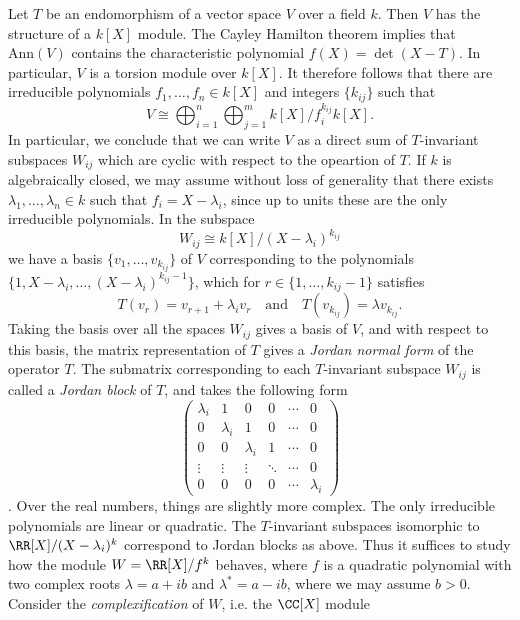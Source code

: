 \begin{example}
    Let $T$ be an endomorphism of a vector space $V$ over a field $k$. Then $V$ has the structure of a $k[X]$ module. The Cayley Hamilton theorem implies that $\text{Ann}(V)$ contains the characteristic polynomial $f(X) = \det(X - T)$. In particular, $V$ is a torsion module over $k[X]$. It therefore follows that there are irreducible polynomials $f_1, \dots, f_n \in k[X]$ and integers $\{ k_{ij} \}$ such that
    \[ V \cong \bigoplus_{i=1}^n \bigoplus_{j = 1}^m k[X]/f_i^{k_{ij}} k[X]. \]
    In particular, we conclude that we can write $V$ as a direct sum of $T$-invariant subspaces $W_{ij}$ which are cyclic with respect to the opeartion of $T$. If $k$ is algebraically closed, we may assume without loss of generality that there exists $\lambda_1, \dots, \lambda_n \in k$ such that $f_i = X - \lambda_i$, since up to units these are the only irreducible polynomials. In the subspace
    \[ W_{ij} \cong k[X] / (X - \lambda_i)^{k_{ij}} \]
    we have a basis $\{ v_1, \dots, v_{k_{ij}} \}$ of $V$ corresponding to the polynomials $\{ 1, X - \lambda_i, \dots, (X - \lambda_i)^{k_{ij}-1} \}$, which for $r \in \{ 1, \dots, k_{ij} - 1 \}$ satisfies
    \[ T(v_r) = v_{r+1} + \lambda_i v_r \quad\text{and}\quad T(v_{k_{ij}}) = \lambda v_{k_{ij}}. \]
    Taking the basis over all the spaces $W_{ij}$ gives a basis of $V$, and with respect to this basis, the matrix representation of $T$ gives a \emph{Jordan normal form} of the operator $T$. The submatrix corresponding to each $T$-invariant subspace $W_{ij}$ is called a \emph{Jordan block} of $T$, and takes the following form
    \[ \begin{pmatrix} \lambda_i & 1 & 0 & 0 & \cdots & 0 \\ 0 & \lambda_i & 1 & 0 & \cdots & 0 \\ 0 & 0 & \lambda_i & 1 & \cdots & 0 \\ \vdots & \vdots & \vdots & \ddots & \cdots & 0 \\ 0 & 0 & 0 & 0 & \cdots & \lambda_i \end{pmatrix} \].
    Over the real numbers, things are slightly more complex. The only irreducible polynomials are linear or quadratic. The $T$-invariant subspaces isomorphic to $\RR[X]/(X - \lambda_i)^k$ correspond to Jordan blocks as above. Thus it suffices to study how the module $W = \RR[X]/f^k$ behaves, where $f$ is a quadratic polynomial with two complex roots $\lambda = a + ib$ and $\lambda^* = a - ib$, where we may assume $b > 0$. Consider the \emph{complexification} of $W$, i.e. the $\CC[X]$ module

\end{example}
